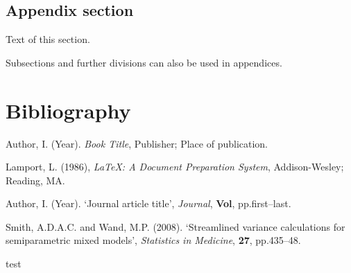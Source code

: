 \documentclass[a4paper, 12pt, notitlepage]{report}
\begin{document}
\section{Appendix section}
%
Text of this section.

Subsections and further divisions can also be used in appendices.

\chapter*{Bibliography}
%
\begin{description}

\item Author, I. (Year). \emph{Book Title}, Publisher; Place of publication.

\item Lamport, L. (1986), \emph{\LaTeX: A Document Preparation System}, Addison-Wesley; Reading, MA.

\item Author, I. (Year). `Journal article title', \emph{Journal}, \textbf{Vol}, pp.first--last.

\item Smith, A.D.A.C. and Wand, M.P. (2008). `Streamlined variance calculations for semiparametric
mixed models', \emph{Statistics in Medicine}, \textbf{27}, pp.435--48.

\end{description}

\begin{titlepage} %
	test
\end{titlepage}
\end{document}
